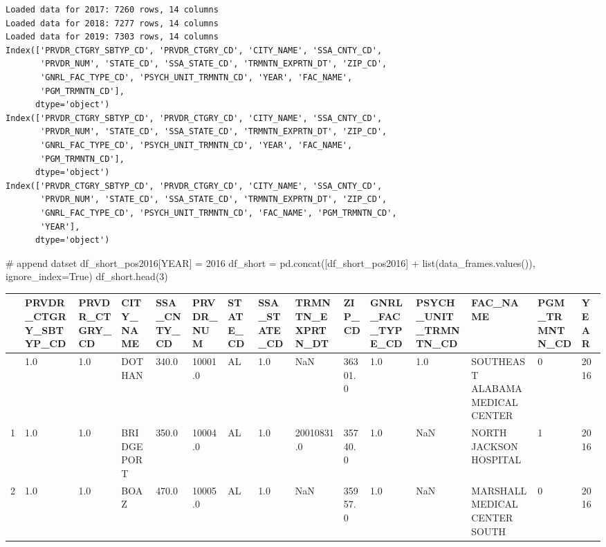 \documentclass[
  letterpaper,
  DIV=11,
  numbers=noendperiod]{scrartcl}
\newenvironment{Shaded}{\begin{snugshade}}{\end{snugshade}}
\newcommand{\BuiltInTok}[1]{\textcolor[rgb]{0.00,0.23,0.31}{#1}}
\newcommand{\CommentTok}[1]{\textcolor[rgb]{0.37,0.37,0.37}{#1}}
\newcommand{\DecValTok}[1]{\textcolor[rgb]{0.68,0.00,0.00}{#1}}
\newcommand{\NormalTok}[1]{\textcolor[rgb]{0.00,0.23,0.31}{#1}}
\newcommand{\OperatorTok}[1]{\textcolor[rgb]{0.37,0.37,0.37}{#1}}
\newcommand{\StringTok}[1]{\textcolor[rgb]{0.13,0.47,0.30}{#1}}
\newcommand{\VariableTok}[1]{\textcolor[rgb]{0.07,0.07,0.07}{#1}}
\begin{document}
\begin{verbatim}
Loaded data for 2017: 7260 rows, 14 columns
Loaded data for 2018: 7277 rows, 14 columns
Loaded data for 2019: 7303 rows, 14 columns
Index(['PRVDR_CTGRY_SBTYP_CD', 'PRVDR_CTGRY_CD', 'CITY_NAME', 'SSA_CNTY_CD',
       'PRVDR_NUM', 'STATE_CD', 'SSA_STATE_CD', 'TRMNTN_EXPRTN_DT', 'ZIP_CD',
       'GNRL_FAC_TYPE_CD', 'PSYCH_UNIT_TRMNTN_CD', 'YEAR', 'FAC_NAME',
       'PGM_TRMNTN_CD'],
      dtype='object')
Index(['PRVDR_CTGRY_SBTYP_CD', 'PRVDR_CTGRY_CD', 'CITY_NAME', 'SSA_CNTY_CD',
       'PRVDR_NUM', 'STATE_CD', 'SSA_STATE_CD', 'TRMNTN_EXPRTN_DT', 'ZIP_CD',
       'GNRL_FAC_TYPE_CD', 'PSYCH_UNIT_TRMNTN_CD', 'YEAR', 'FAC_NAME',
       'PGM_TRMNTN_CD'],
      dtype='object')
Index(['PRVDR_CTGRY_SBTYP_CD', 'PRVDR_CTGRY_CD', 'CITY_NAME', 'SSA_CNTY_CD',
       'PRVDR_NUM', 'STATE_CD', 'SSA_STATE_CD', 'TRMNTN_EXPRTN_DT', 'ZIP_CD',
       'GNRL_FAC_TYPE_CD', 'PSYCH_UNIT_TRMNTN_CD', 'FAC_NAME', 'PGM_TRMNTN_CD',
       'YEAR'],
      dtype='object')
\end{verbatim}

\begin{Shaded}
\begin{Highlighting}[]
\CommentTok{\# append datset}
\NormalTok{df\_short\_pos2016[}\StringTok{\textquotesingle{}YEAR\textquotesingle{}}\NormalTok{] }\OperatorTok{=} \DecValTok{2016}
\NormalTok{df\_short }\OperatorTok{=}\NormalTok{ pd.concat([df\_short\_pos2016] }\OperatorTok{+} \BuiltInTok{list}\NormalTok{(data\_frames.values()), ignore\_index}\OperatorTok{=}\VariableTok{True}\NormalTok{)}
\NormalTok{df\_short.head(}\DecValTok{3}\NormalTok{)}
\end{Highlighting}
\end{Shaded}

\begin{longtable}[]{@{}lllllllllllllll@{}}
\toprule\noalign{}
& PRVDR\_CTGRY\_SBTYP\_CD & PRVDR\_CTGRY\_CD & CITY\_NAME &
SSA\_CNTY\_CD & PRVDR\_NUM & STATE\_CD & SSA\_STATE\_CD &
TRMNTN\_EXPRTN\_DT & ZIP\_CD & GNRL\_FAC\_TYPE\_CD &
PSYCH\_UNIT\_TRMNTN\_CD & FAC\_NAME & PGM\_TRMNTN\_CD & YEAR \\
\midrule\noalign{}
\endhead
\bottomrule\noalign{}
\endlastfoot
0 & 1.0 & 1.0 & DOTHAN & 340.0 & 10001.0 & AL & 1.0 & NaN & 36301.0 &
1.0 & 1.0 & SOUTHEAST ALABAMA MEDICAL CENTER & 0 & 2016 \\
1 & 1.0 & 1.0 & BRIDGEPORT & 350.0 & 10004.0 & AL & 1.0 & 20010831.0 &
35740.0 & 1.0 & NaN & NORTH JACKSON HOSPITAL & 1 & 2016 \\
2 & 1.0 & 1.0 & BOAZ & 470.0 & 10005.0 & AL & 1.0 & NaN & 35957.0 & 1.0
& NaN & MARSHALL MEDICAL CENTER SOUTH & 0 & 2016 \\
\end{longtable}
\end{document}
